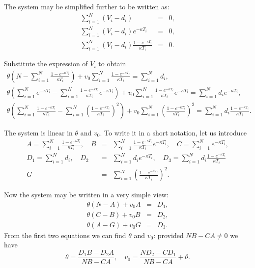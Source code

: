 \documentclass[12pt,amsfonts,enumerate,amscd]{amsart}
\numberwithin{table}{section}
\numberwithin{equation}{section}
\newcommand{\bbe}{\begin{equation}\label}
\newcommand{\ee}{\end{equation}}
\begin{document}
The system may be simplified further to be written as:
\begin{eqnarray*}%
\sum_{i=1}^N \left( V_i - d_i\right) &=& 0,\\
\sum_{i=1}^N \left( V_i - d_i \right)e^{-\kappa T_i}&=&0,\\
\sum_{i=1}^N \left( V_i - d_i \right)\frac{1-e^{-\kappa T_i}}{\kappa T_i} &=&0.
\end{eqnarray*}

Substitute the expression of $V_i$ to obtain
\begin{eqnarray*}%
\theta\left( N - \sum_{i=1}^N \frac{1-e^{-\kappa T_i}}{\kappa T_i}\right) + v_0\sum_{i=1}^N \frac{1-e^{-\kappa T_i}}{\kappa T_i} = \sum_{i=1}^N d_i,\\
\theta\left( \sum_{i=1}^N e^{-\kappa T_i}- \sum_{i=1}^N \frac{1-e^{-\kappa T_i}}{\kappa T_i}e^{-\kappa T_i}\right) + v_0\sum_{i=1}^N \frac{1-e^{-\kappa T_i}}{\kappa T_i}e^{-\kappa T_i} = \sum_{i=1}^N d_ie^{-\kappa T_i},\\
\theta\left( \sum_{i=1}^N \frac{1-e^{-\kappa T_i}}{\kappa T_i}- \sum_{i=1}^N \left(\frac{1-e^{-\kappa T_i}}{\kappa T_i}\right)^2 \right) + v_0\sum_{i=1}^N \left(\frac{1-e^{-\kappa T_i}}{\kappa T_i}\right)^2 = \sum_{i=1}^N d_i \frac{1-e^{-\kappa T_i}}{\kappa T_i}.
\end{eqnarray*}

The system is linear in $\theta$ and $v_0$. To write it in a short notation, let us introduce
\begin{eqnarray*}%
A = \sum_{i=1}^N \frac{1-e^{-\kappa T_i}}{\kappa T_i},\quad B &=& \sum_{i=1}^N \frac{1-e^{-\kappa T_i}}{\kappa T_i}e^{-\kappa T_i}, \quad C = \sum_{i=1}^N e^{-\kappa T_i}, \\
D_1 = \sum_{i=1}^N d_i, \quad D_2 &=& \sum_{i=1}^N d_ie^{-\kappa T_i}, \quad D_3 = \sum_{i=1}^N d_i \frac{1-e^{-\kappa T_i}}{\kappa T_i} \\
G &=& \sum_{i=1}^N \left(\frac{1-e^{-\kappa T_i}}{\kappa T_i}\right)^2.
\end{eqnarray*}

Now the system may be written in a very simple view:
\begin{eqnarray*}%
\theta\left( N - A \right) + v_0 A &=& D_1,\\
\theta\left( C - B \right) + v_0 B &=& D_2,\\
\theta\left( A - G \right) + v_0 G &=& D_3.
\end{eqnarray*}
From the first two equations we can find $\theta$ and $v_0$: provided $N B - C A \ne 0$ we have 
\bbe{thetav0}
\theta = \frac{D_1 B - D_2 A}{N B - C A}, \quad v_0 = \frac{N D_2 - C D_1}{N B - C A} + \theta.
\ee 
\end{document}
